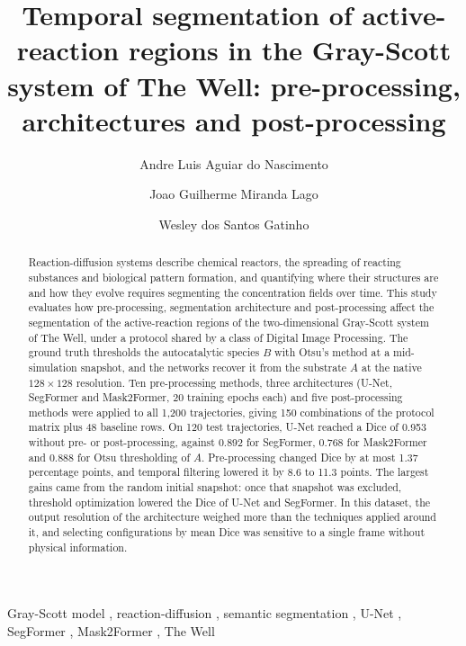 \documentclass[final,5p,times,twocolumn]{elsarticle}
\begin{document}
\begin{frontmatter}

\title{Temporal segmentation of active-reaction regions in the Gray-Scott system of The Well: pre-processing, architectures and post-processing}

\author[a]{Andre Luis Aguiar do Nascimento}

\author[a]{Joao Guilherme Miranda Lago}

\author[a]{Wesley dos Santos Gatinho}


\begin{abstract}
Reaction-diffusion systems describe chemical reactors, the spreading of reacting substances and biological pattern formation, and quantifying where their structures are and how they evolve requires segmenting the concentration fields over time. This study evaluates how pre-processing, segmentation architecture and post-processing affect the segmentation of the active-reaction regions of the two-dimensional Gray-Scott system of The Well, under a protocol shared by a class of Digital Image Processing. The ground truth thresholds the autocatalytic species $B$ with Otsu's method at a mid-simulation snapshot, and the networks recover it from the substrate $A$ at the native $128\times128$ resolution. Ten pre-processing methods, three architectures (U-Net, SegFormer and Mask2Former, 20 training epochs each) and five post-processing methods were applied to all 1,200 trajectories, giving 150 combinations of the protocol matrix plus 48 baseline rows. On 120 test trajectories, U-Net reached a Dice of 0.953 without pre- or post-processing, against 0.892 for SegFormer, 0.768 for Mask2Former and 0.888 for Otsu thresholding of $A$. Pre-processing changed Dice by at most 1.37 percentage points, and temporal filtering lowered it by 8.6 to 11.3 points. The largest gains came from the random initial snapshot: once that snapshot was excluded, threshold optimization lowered the Dice of U-Net and SegFormer. In this dataset, the output resolution of the architecture weighed more than the techniques applied around it, and selecting configurations by mean Dice was sensitive to a single frame without physical information.
\end{abstract}

\begin{keyword}
Gray-Scott model \sep
reaction-diffusion \sep
semantic segmentation \sep
U-Net \sep
SegFormer \sep
Mask2Former \sep
The Well
\end{keyword}

\end{frontmatter}
\end{document}
